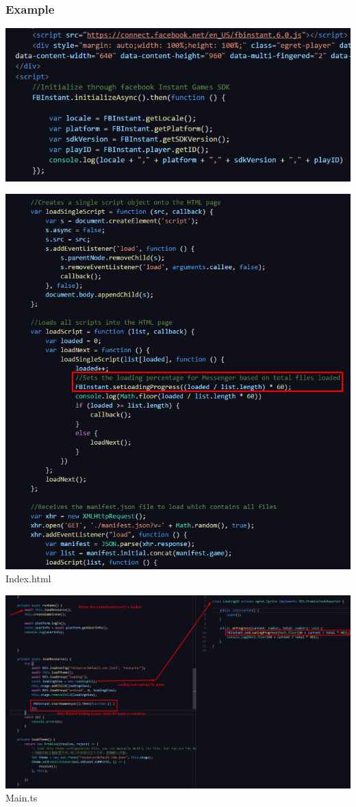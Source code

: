 \documentclass{article}
\begin{document}
\subsubsection{Example}
\begin{center}
\includegraphics[width = \textwidth]{images/FacebookInitialize.png} 

\includegraphics[width = \textwidth]{images/FacebookLoading.png} Index.html

\includegraphics[width = \textwidth]{images/FacebookInitialize2.png} Main.ts
\end{center}
\end{document}
